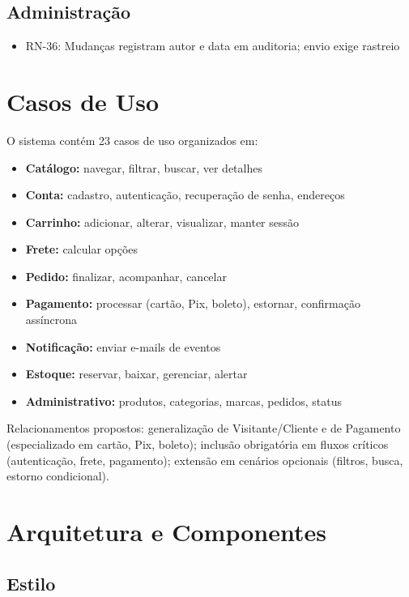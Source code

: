 \documentclass[12pt,a4paper]{article}
\providecommand{\tightlist}{%
  \setlength{\itemsep}{0pt}\setlength{\parskip}{0pt}}
\begin{document}
\subsection{Administração}

\begin{itemize}
\tightlist
\item RN-36: Mudanças registram autor e data em auditoria; envio exige rastreio
\end{itemize}

\section{Casos de Uso}\label{sec:casos-uso}

O sistema contém 23 casos de uso organizados em:

\begin{itemize}
\tightlist
\item \textbf{Catálogo:} navegar, filtrar, buscar, ver detalhes
\item \textbf{Conta:} cadastro, autenticação, recuperação de senha, endereços
\item \textbf{Carrinho:} adicionar, alterar, visualizar, manter sessão
\item \textbf{Frete:} calcular opções
\item \textbf{Pedido:} finalizar, acompanhar, cancelar
\item \textbf{Pagamento:} processar (cartão, Pix, boleto), estornar, confirmação assíncrona
\item \textbf{Notificação:} enviar e-mails de eventos
\item \textbf{Estoque:} reservar, baixar, gerenciar, alertar
\item \textbf{Administrativo:} produtos, categorias, marcas, pedidos, status
\end{itemize}

Relacionamentos propostos: generalização de Visitante/Cliente e de
Pagamento (especializado em cartão, Pix, boleto); inclusão obrigatória
em fluxos críticos (autenticação, frete, pagamento); extensão em cenários
opcionais (filtros, busca, estorno condicional).

\section{Arquitetura e Componentes}\label{sec:arquitetura}

\subsection{Estilo}
\end{document}
